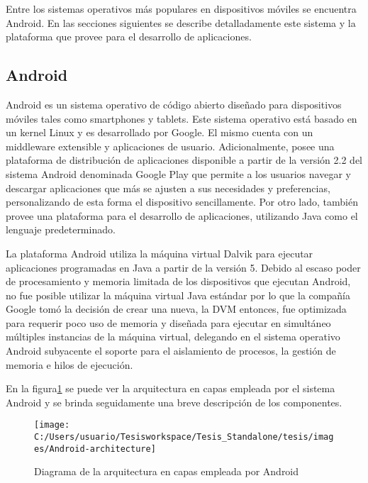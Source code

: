 Entre los sistemas operativos más populares en dispositivos móviles
se encuentra Android. En las secciones siguientes se describe detalladamente
este sistema y la plataforma que provee para el desarrollo de aplicaciones. 


\subsection{Android \label{sec:Android}}

Android es un sistema operativo de código abierto diseñado para dispositivos
móviles tales como smartphones y tablets. Este sistema operativo está
basado en un kernel Linux y es desarrollado por Google. El mismo cuenta
con un middleware extensible y aplicaciones de usuario. Adicionalmente,
posee una plataforma de distribución de aplicaciones disponible a
partir de la versión 2.2 del sistema Android denominada Google Play
que permite a los usuarios navegar y descargar aplicaciones que más
se ajusten a sus necesidades y preferencias, personalizando de esta
forma el dispositivo sencillamente. Por otro lado, también provee
una plataforma para el desarrollo de aplicaciones, utilizando Java
como el lenguaje predeterminado. 

La plataforma Android utiliza la máquina virtual Dalvik para ejecutar
aplicaciones programadas en Java a partir de la versión 5. Debido
al escaso poder de procesamiento y memoria limitada de los dispositivos
que ejecutan Android, no fue posible utilizar la máquina virtual Java
estándar por lo que la compañía Google tomó la decisión de crear una
nueva, la \ac{DVM} entonces, fue optimizada para requerir poco uso
de memoria y diseñada para ejecutar en simultáneo múltiples instancias
de la máquina virtual, delegando en el sistema operativo Android subyacente
el soporte para el aislamiento de procesos, la gestión de memoria
e hilos de ejecución. 

En la figura\ref{fig:Android-architecture} se puede ver la arquitectura
en capas empleada por el sistema Android y se brinda seguidamente
una breve descripción de los componentes. 

\begin{figure}
\begin{centering}
\texttt{[image: C:/Users/usuario/Tesisworkspace/Tesis\_Standalone/tesis/images/Android-architecture]}
\par\end{centering}

\caption{Diagrama de la arquitectura en capas empleada por Android\label{fig:Android-architecture}}
\end{figure}


